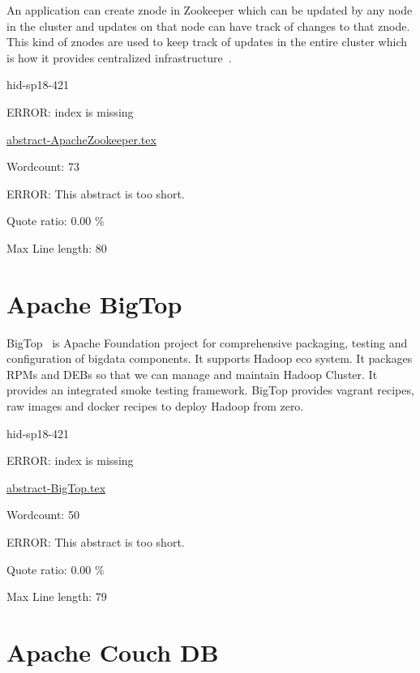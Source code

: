 An application can create znode in Zookeeper which can be updated by any node in
the cluster and updates on that node can have track of changes to that znode.
This kind of znodes are used to keep track of updates in the entire cluster
which is how it provides centralized 
infrastructure~\cite{hid-sp18-421-zookeeper}.




\begin{IU}

hid-sp18-421

ERROR: index is missing

\href{https://github.com/cloudmesh-community/hid-sp18-421/blob/master//technology/abstract-ApacheZookeeper.tex}{abstract-ApacheZookeeper.tex}

 

Wordcount: 73

ERROR: This abstract is too short.


Quote ratio: 0.00 \%
 
Max Line length: 80
\end{IU}

\section{Apache BigTop}

BigTop~\cite{hid-sp18-421-BigTopCloud} is Apache Foundation project for
comprehensive packaging, testing and configuration of bigdata components. It
supports Hadoop eco system. It packages RPMs and DEBs so that we can manage and
maintain Hadoop Cluster. It provides an integrated smoke testing framework.
BigTop provides vagrant recipes, raw images and docker recipes to deploy Hadoop
from zero.



\begin{IU}

hid-sp18-421

ERROR: index is missing

\href{https://github.com/cloudmesh-community/hid-sp18-421/blob/master//technology/abstract-BigTop.tex}{abstract-BigTop.tex}

 

Wordcount: 50

ERROR: This abstract is too short.


Quote ratio: 0.00 \%
 
Max Line length: 79
\end{IU}

\section{Apache Couch DB}

